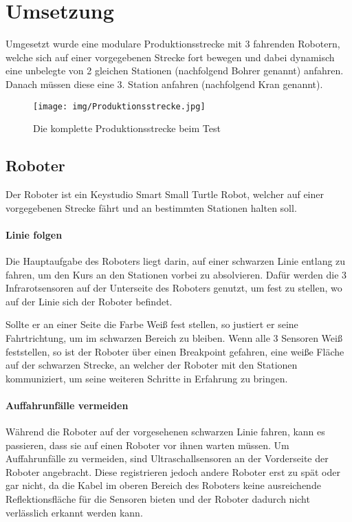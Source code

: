 \chapter{Umsetzung}
Umgesetzt wurde eine modulare Produktionsstrecke mit 3 fahrenden Robotern, welche sich auf einer vorgegebenen Strecke fort bewegen und dabei dynamisch eine unbelegte von 2 gleichen Stationen (nachfolgend Bohrer genannt) anfahren. Danach müssen diese eine 3. Station anfahren (nachfolgend Kran genannt).
\begin{figure}[h]
\begin{center}
\texttt{[image: img/Produktionsstrecke.jpg]}
\caption{Die komplette Produktionsstrecke beim Test}
\end{center}
\end{figure}

\section{Roboter}
Der Roboter ist ein Keystudio Smart Small Turtle Robot, welcher auf einer vorgegebenen Strecke fährt und an bestimmten Stationen halten soll.
\subsubsection{Linie folgen}
Die Hauptaufgabe des Roboters liegt darin, auf einer schwarzen Linie entlang zu fahren, um den Kurs an den Stationen vorbei zu absolvieren. Dafür werden die 3 Infrarotsensoren auf der Unterseite des Roboters genutzt, um fest zu stellen, wo auf der Linie sich der Roboter befindet.

Sollte er an einer Seite die Farbe Weiß fest stellen, so justiert er seine Fahrtrichtung, um im schwarzen Bereich zu bleiben. Wenn alle 3 Sensoren Weiß feststellen, so ist der Roboter über einen Breakpoint gefahren, eine weiße Fläche auf der schwarzen Strecke, an welcher der Roboter mit den Stationen kommuniziert, um seine weiteren Schritte in Erfahrung zu bringen.

\subsubsection{Auffahrunfälle vermeiden}
Während die Roboter auf der vorgesehenen schwarzen Linie fahren, kann es passieren, dass sie auf einen Roboter vor ihnen warten müssen. Um Auffahrunfälle zu vermeiden, sind Ultraschallsensoren an der Vorderseite der Roboter angebracht. Diese registrieren jedoch andere Roboter erst zu spät oder gar nicht, da die Kabel im oberen Bereich des Roboters keine ausreichende Reflektionsfläche für die Sensoren bieten und der Roboter dadurch nicht verlässlich erkannt werden kann.

